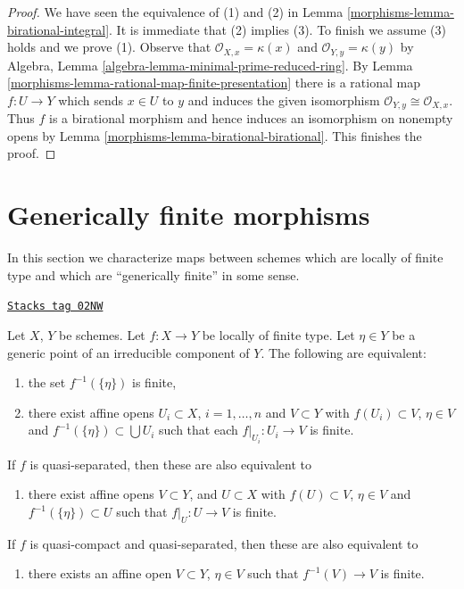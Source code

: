 \begin{proof}

We have seen the equivalence of (1) and (2) in
Lemma \ref{morphisms-lemma-birational-integral}.
It is immediate that (2) implies (3).
To finish we assume (3) holds and we prove (1).
Observe that $\mathcal{O}_{X, x} = \kappa(x)$ and
$\mathcal{O}_{Y, y} = \kappa(y)$ by
Algebra, Lemma \ref{algebra-lemma-minimal-prime-reduced-ring}.
By Lemma \ref{morphisms-lemma-rational-map-finite-presentation}
there is a rational map $f : U \to Y$
which sends $x \in U$ to $y$ and induces
the given isomorphism $\mathcal{O}_{Y, y} \cong \mathcal{O}_{X, x}$.
Thus $f$ is a birational morphism and hence induces
an isomorphism on nonempty opens
by Lemma \ref{morphisms-lemma-birational-birational}.
This finishes the proof.
\end{proof}

\section{Generically finite morphisms}
\label{morphisms-section-generically-finite}
In this section we characterize maps between schemes
which are locally of finite type and which are ``generically finite''
in some sense.

\begin{lemma}
\label{morphisms-lemma-generically-finite}
\href{https://stacks.math.columbia.edu/tag/02NW}{\texttt{Stacks tag 02NW}}

Let $X$, $Y$ be schemes.
Let $f : X \to Y$ be locally of finite type.
Let $\eta \in Y$ be a generic point of an irreducible component
of $Y$. The following are equivalent:
\begin{enumerate}
\item the set $f^{-1}(\{\eta\})$ is finite,
\item there exist affine opens $U_i \subset X$, $i = 1, \ldots, n$
and $V \subset Y$ with $f(U_i) \subset V$,
$\eta \in V$ and $f^{-1}(\{\eta\}) \subset \bigcup U_i$
such that each $f|_{U_i} : U_i \to V$ is finite.
\end{enumerate}
If $f$ is quasi-separated, then these are also equivalent to
\begin{enumerate}
\item[(3)] there exist affine opens $V \subset Y$,
and $U \subset X$ with $f(U) \subset V$,
$\eta \in V$ and $f^{-1}(\{\eta\}) \subset U$
such that $f|_U : U \to V$ is finite.
\end{enumerate}
If $f$ is quasi-compact and quasi-separated,
then these are also equivalent to
\begin{enumerate}
\item[(4)] there exists an affine open $V \subset Y$, $\eta \in V$
such that $f^{-1}(V) \to V$ is finite.
\end{enumerate}
\end{lemma}


